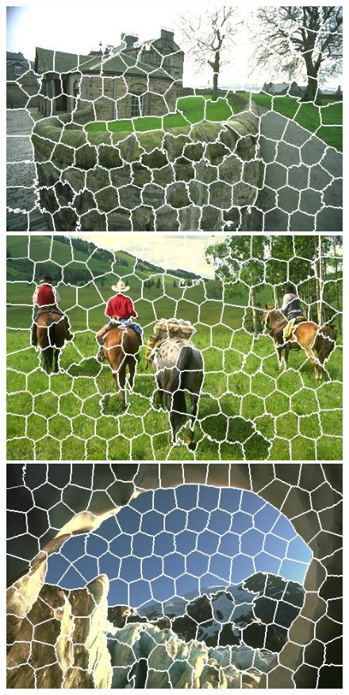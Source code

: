\begin{figure}[h]
{\begin{minipage}[b]{0.13\linewidth}
\includegraphics[width=1\linewidth]{figures/img/SLIC/SLIC_92014.jpg}
\includegraphics[width=1\linewidth]{figures/img/SLIC/SLIC_220003.jpg}
\includegraphics[width=1\linewidth]{figures/img/SLIC/SLIC_176051.jpg}

\end{minipage}}
\end{figure}
